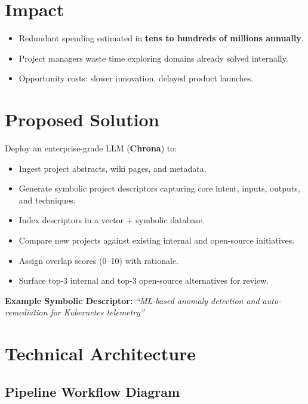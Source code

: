 \documentclass[12pt,a4paper]{article}
\begin{document}
\section{Impact}
\begin{itemize}[leftmargin=2em]
    \item Redundant spending estimated in \textbf{tens to hundreds of millions annually}.
    \item Project managers waste time exploring domains already solved internally.
    \item Opportunity costs: slower innovation, delayed product launches.
\end{itemize}

\section{Proposed Solution}
Deploy an enterprise-grade LLM (\textbf{Chrona}) to:
\begin{itemize}[leftmargin=2em]
  \item Ingest project abstracts, wiki pages, and metadata.
  \item Generate symbolic project descriptors capturing core intent, inputs, outputs, and techniques.
  \item Index descriptors in a vector + symbolic database.
  \item Compare new projects against existing internal and open-source initiatives.
  \item Assign overlap scores (0--10) with rationale.
  \item Surface top-3 internal and top-3 open-source alternatives for review.
\end{itemize}

\textbf{Example Symbolic Descriptor:} \textit{“ML-based anomaly detection and auto-remediation for Kubernetes telemetry”}

\section{Technical Architecture}
\subsection{Pipeline Workflow Diagram}
\end{document}

